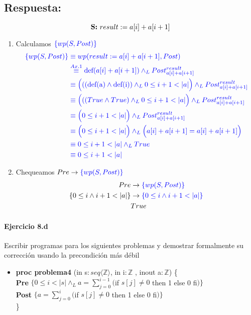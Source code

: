 \documentclass[a4paper]{article}
\begin{document}
\subsection*{Respuesta:}
$$\textbf{S:} \  result := a[i] + a[i + 1]\\$$
\begin{enumerate}

\item Calculamos $\color{blue}\{wp(S,Post)\}$
		\begin{align*}
		\color{blue}\{wp(S,Post)\}
			&\color{blue} \equiv wp(result := a[i] + a[i + 1],Post) \\
			&\color{blue} \stackrel{Ax.1}{\equiv}
			\textrm{def}(a[i] + a[i + 1])\wedge_L Post_{a[i]+a[i+1]}^{result} \\
			&\color{blue} \equiv \Big(((\textrm{def(a)}\wedge
				 \textrm{def(i)})\wedge_L 0\leq i+1<|a|\Big)\wedge_L Post_{a[i]+a[i+1]}^{result} \\
			&\color{blue} \equiv \Big(((True\wedge
				 True)\wedge_L 0\leq i+1<|a|\Big)\wedge_L Post_{a[i]+a[i+1]}^{result} \\
			&\color{blue} \equiv \Big( 0\leq i+1<|a|\Big)\wedge_L Post_{a[i]+a[i+1]}^{result} \\
			&\color{blue} \equiv \Big( 0\leq i+1<|a|\Big)\wedge_L \Big(a[i] + a[i + 1]=a[i] + a[i + 1]\Big) \\
			&\color{blue} \equiv  0\leq i+1<|a|\wedge_L True \\
			&\color{blue} \equiv  0\leq i+1<|a| \\		  		
		\end{align*}
\item Chequeamos $Pre \rightarrow \color{blue}\{wp(S,Post)\}$		
		\begin{align*}
		Pre &\rightarrow \color{blue}\{wp(S,Post)\}\\
		\{0 \leq i \wedge i + 1 < |a|\}&\rightarrow \color{blue}\{0\leq i \wedge i+1<|a|\}\\
		& True 
		\end{align*}
\end{enumerate}
\paragraph{Ejercicio 8.d} Escribir programas para los siguientes problemas y demostrar 
formalmente su corrección usando la precondición más débil

\begin{itemize}
\item \textbf{proc problema4 }(in s$: seq\langle \mathbb{Z}\rangle$, in i$:\mathbb{Z}$
	, inout a$: \mathbb{Z}$) \{\smallskip \\                            
    \hspace*{6mm} \textbf{Pre }$\{0 \leq i < |s| \wedge_L a=\sum_{j=0}^{i-1}($if $s[j] \neq 0$ 
    then 1 else 0 fi$)\}$\smallskip \\          
   \hspace*{6mm} \textbf{Post }$\{a=\sum_{j=0}^{i}($if $s[j] \neq 0$ 
    then 1 else 0 fi$)\}$\\
   \}     
\end{itemize}
\end{document}

